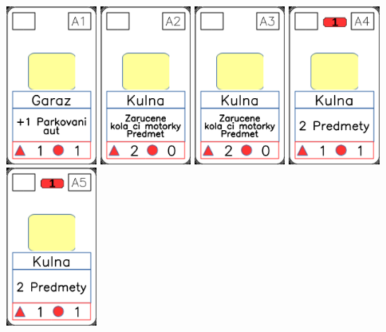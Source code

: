\documentclass[a4paper]{article}
\begin{document}
	\includegraphics[width=3.0cm]{img-1_15}
	\includegraphics[width=3.0cm]{img-1_16}
	\includegraphics[width=3.0cm]{img-1_17}
	\includegraphics[width=3.0cm]{img-1_18}
	\includegraphics[width=3.0cm]{img-1_19}
\end{document}
